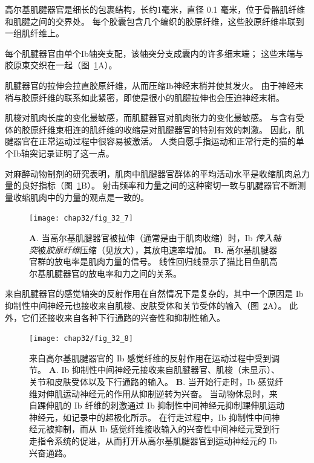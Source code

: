 \begin{proposition}[神经解剖学导航术语] \label{box:32_4}
	
	\quad \quad 高尔基肌腱器官是细长的包裹结构，长约1毫米，直径 0.1 毫米，位于骨骼肌纤维和肌腱之间的交界处。
	每个胶囊包含几个编织的胶原纤维，这些胶原纤维串联到一组肌纤维上。
	
	\quad \quad 每个肌腱器官由单个Ib轴突支配，该轴突分支成囊内的许多细末端；
	这些末端与胶原束交织在一起（图~\ref{fig:32_7}A）。
	
	\quad \quad 肌腱器官的拉伸会拉直胶原纤维，从而压缩Ib神经末梢并使其发火。
	由于神经末梢与胶原纤维的联系如此紧密，即使是很小的肌腱拉伸也会压迫神经末梢。
	
	\quad \quad 肌梭对肌肉长度的变化最敏感，而肌腱器官对肌肉张力的变化最敏感。
	与含有受体的胶原纤维束相连的肌纤维的收缩是对肌腱器官的特别有效的刺激。
	因此，肌腱器官在正常运动过程中很容易被激活。
	人类自愿手指运动和正常行走的猫的单个Ib轴突记录证明了这一点。
	
	\quad \quad 对麻醉动物制剂的研究表明，肌肉中肌腱器官群体的平均活动水平是收缩肌肉总力量的良好指标（图~\ref{fig:32_7}B）。
	射击频率和力量之间的这种密切一致与肌腱器官不断测量收缩肌肉中的力量的观点是一致的。
	
\end{proposition}


\begin{figure}[htbp]
	\centering
	\texttt{[image: chap32/fig\_32\_7]}
	\caption{\textbf{A}. 当高尔基肌腱器官被拉伸（通常是由于肌肉收缩）时，Ib \textit{传入轴突}被\textit{胶原纤维}压缩（见放大），其放电速率增加\cite{biederman2013human}。
	\textbf{B.} 高尔基肌腱器官群的放电率是肌肉力量的信号。
	线性回归线显示了猫比目鱼肌高尔基肌腱器官的放电率和力之间的关系\cite{crago1982sampling}。}
	\label{fig:32_7}
\end{figure}


来自肌腱器官的感觉轴突的反射作用在自然情况下是复杂的，其中一个原因是 Ib 抑制性中间神经元也接收来自肌梭、皮肤受体和关节受体的输入（图~\ref{fig:32_8}A）。
此外，它们还接收来自各种下行通路的兴奋性和抑制性输入。


\begin{figure}[htbp]
	\centering
	\texttt{[image: chap32/fig\_32\_8]}
	\caption{来自高尔基肌腱器官的 Ib 感觉纤维的反射作用在运动过程中受到调节。
	\textbf{A}. Ib 抑制性中间神经元接收来自肌腱器官、肌梭（未显示）、关节和皮肤受体以及下行通路的输入。
	\textbf{B}. 当开始行走时，Ib 感觉纤维对伸肌运动神经元的作用从抑制逆转为兴奋。
	当动物休息时，来自踝伸肌的 Ib 纤维的刺激通过 Ib 抑制性中间神经元抑制踝伸肌运动神经元，如记录中的超极化所示。
	在行走过程中，Ib 抑制性中间神经元被抑制，而从 Ib 感觉纤维接收输入的兴奋性中间神经元受到行走指令系统的促进，从而打开从高尔基肌腱器官到运动神经元的 Ib 兴奋通路。}
	\label{fig:32_8}
\end{figure}


